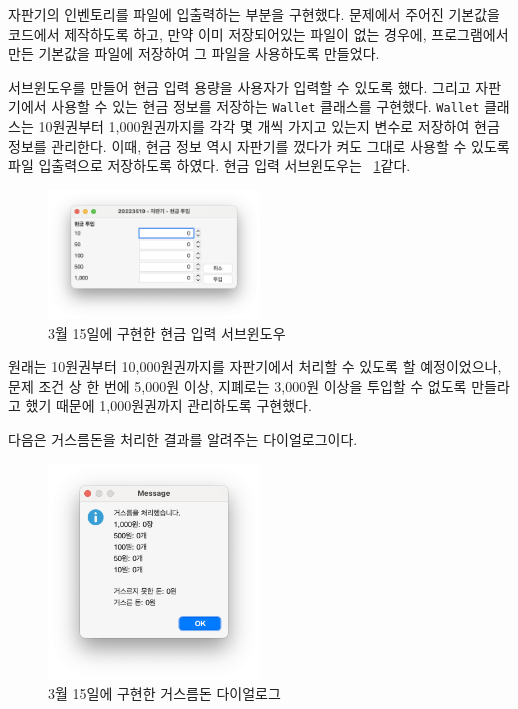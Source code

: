 \documentclass{oblivoir}
\newcommand{\figref}[1]{\figurename~\ref{#1}}
\begin{document}
    자판기의 인벤토리를 파일에 입출력하는 부분을 구현했다.
    문제에서 주어진 기본값을 코드에서 제작하도록 하고,
    만약 이미 저장되어있는 파일이 없는 경우에, 프로그램에서 만든 기본값을 파일에 저장하여
    그 파일을 사용하도록 만들었다.

    서브윈도우를 만들어 현금 입력 용량을 사용자가 입력할 수 있도록 했다.
    그리고 자판기에서 사용할 수 있는 현금 정보를 저장하는 \texttt{Wallet} 클래스를 구현했다.
    \texttt{Wallet} 클래스는 10원권부터 1,000원권까지를 각각 몇 개씩 가지고 있는지 변수로 저장하여 현금 정보를 관리한다.
    이때, 현금 정보 역시 자판기를 껐다가 켜도 그대로 사용할 수 있도록 파일 입출력으로 저장하도록 하였다.
    현금 입력 서브윈도우는 \figref{fig:0315-cash-input-prompt}\과 같다.
    \begin{figure}[h]
        \centering
        \includegraphics[width=0.5\textwidth]{0315-cash-input-prompt}
        \caption{3월 15일에 구현한 현금 입력 서브윈도우}
        \label{fig:0315-cash-input-prompt}
    \end{figure}

    원래는 10원권부터 10,000원권까지를 자판기에서 처리할 수 있도록 할 예정이었으나,
    문제 조건 상 한 번에 5,000원 이상, 지폐로는 3,000원 이상을 투입할 수 없도록 만들라고 했기 때문에
    1,000원권까지 관리하도록 구현했다.

    다음은 거스름돈을 처리한 결과를 알려주는 다이얼로그이다.
    \begin{figure}[h]
        \centering
        \includegraphics[width=0.5\textwidth]{0315-change-dialog}
        \caption{3월 15일에 구현한 거스름돈 다이얼로그}
        \label{fig:0315-change-dialog}
    \end{figure}
\end{document}
